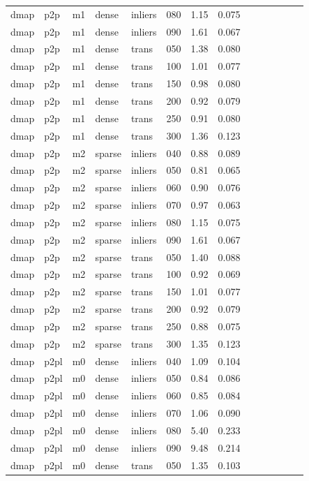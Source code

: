 \begin{table}[htbp]
\begin{tabular}{llllllrrrrrrrr}
  dmap & p2p & m1 & dense & inliers & 080 & 1.15 & 0.075 \\
  dmap & p2p & m1 & dense & inliers & 090 & 1.61 & 0.067 \\
  dmap & p2p & m1 & dense & trans & 050 & 1.38 & 0.080 \\
  dmap & p2p & m1 & dense & trans & 100 & 1.01 & 0.077 \\
  dmap & p2p & m1 & dense & trans & 150 & 0.98 & 0.080 \\
  dmap & p2p & m1 & dense & trans & 200 & 0.92 & 0.079 \\
  dmap & p2p & m1 & dense & trans & 250 & 0.91 & 0.080 \\
  dmap & p2p & m1 & dense & trans & 300 & 1.36 & 0.123 \\
  dmap & p2p & m2 & sparse & inliers & 040 & 0.88 & 0.089 \\
  dmap & p2p & m2 & sparse & inliers & 050 & 0.81 & 0.065 \\
  dmap & p2p & m2 & sparse & inliers & 060 & 0.90 & 0.076 \\
  dmap & p2p & m2 & sparse & inliers & 070 & 0.97 & 0.063 \\
  dmap & p2p & m2 & sparse & inliers & 080 & 1.15 & 0.075 \\
  dmap & p2p & m2 & sparse & inliers & 090 & 1.61 & 0.067 \\
  dmap & p2p & m2 & sparse & trans & 050 & 1.40 & 0.088 \\
  dmap & p2p & m2 & sparse & trans & 100 & 0.92 & 0.069 \\
  dmap & p2p & m2 & sparse & trans & 150 & 1.01 & 0.077 \\
  dmap & p2p & m2 & sparse & trans & 200 & 0.92 & 0.079 \\
  dmap & p2p & m2 & sparse & trans & 250 & 0.88 & 0.075 \\
  dmap & p2p & m2 & sparse & trans & 300 & 1.35 & 0.123 \\
  dmap & p2pl & m0 & dense & inliers & 040 & 1.09 & 0.104 \\
  dmap & p2pl & m0 & dense & inliers & 050 & 0.84 & 0.086 \\
  dmap & p2pl & m0 & dense & inliers & 060 & 0.85 & 0.084 \\
  dmap & p2pl & m0 & dense & inliers & 070 & 1.06 & 0.090 \\
  dmap & p2pl & m0 & dense & inliers & 080 & 5.40 & 0.233 \\
  dmap & p2pl & m0 & dense & inliers & 090 & 9.48 & 0.214 \\
  dmap & p2pl & m0 & dense & trans & 050 & 1.35 & 0.103 \\

\end{tabular}
\end{table}
